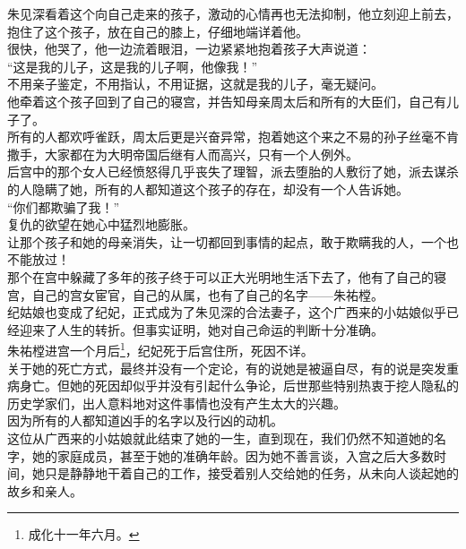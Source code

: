 \begin{multicols}{\theparacolNo}
朱见深看着这个向自己走来的孩子，激动的心情再也无法抑制，他立刻迎上前去，抱住了这个孩子，放在自己的膝上，仔细地端详着他。\\

很快，他哭了，他一边流着眼泪，一边紧紧地抱着孩子大声说道：\\

“这是我的儿子，这是我的儿子啊，他像我！”\\

不用亲子鉴定，不用指认，不用证据，这就是我的儿子，毫无疑问。\\

他牵着这个孩子回到了自己的寝宫，并告知母亲周太后和所有的大臣们，自己有儿子了。\\

所有的人都欢呼雀跃，周太后更是兴奋异常，抱着她这个来之不易的孙子丝毫不肯撒手，大家都在为大明帝国后继有人而高兴，只有一个人例外。\\

后宫中的那个女人已经愤怒得几乎丧失了理智，派去堕胎的人敷衍了她，派去谋杀的人隐瞒了她，所有的人都知道这个孩子的存在，却没有一个人告诉她。\\

“你们都欺骗了我！”\\

复仇的欲望在她心中猛烈地膨胀。\\

让那个孩子和她的母亲消失，让一切都回到事情的起点，敢于欺瞒我的人，一个也不能放过！\\

那个在宫中躲藏了多年的孩子终于可以正大光明地生活下去了，他有了自己的寝宫，自己的宫女宦官，自己的从属，也有了自己的名字——朱祐樘。\\

纪姑娘也变成了纪妃，正式成为了朱见深的合法妻子，这个广西来的小姑娘似乎已经迎来了人生的转折。但事实证明，她对自己命运的判断十分准确。\\

朱祐樘进宫一个月后\footnote{成化十一年六月。}，纪妃死于后宫住所，死因不详。\\

关于她的死亡方式，最终并没有一个定论，有的说她是被逼自尽，有的说是突发重病身亡。但她的死因却似乎并没有引起什么争论，后世那些特别热衷于挖人隐私的历史学家们，出人意料地对这件事情也没有产生太大的兴趣。\\

因为所有的人都知道凶手的名字以及行凶的动机。\\

这位从广西来的小姑娘就此结束了她的一生，直到现在，我们仍然不知道她的名字，她的家庭成员，甚至于她的准确年龄。因为她不善言谈，入宫之后大多数时间，她只是静静地干着自己的工作，接受着别人交给她的任务，从未向人谈起她的故乡和亲人。\\


\end{multicols}
